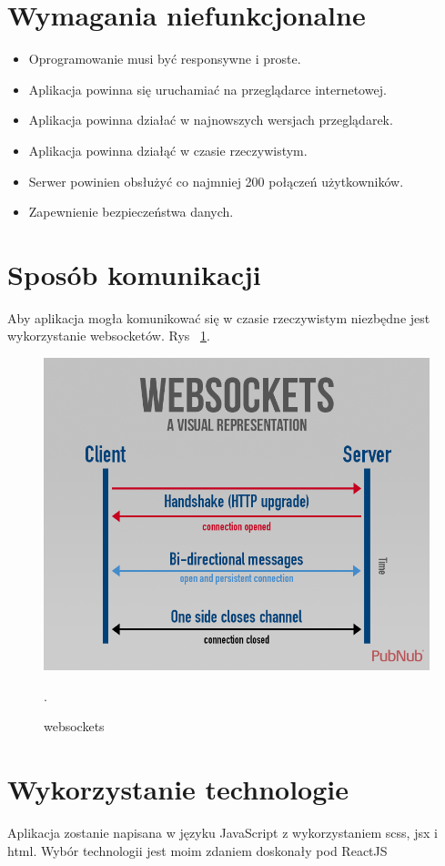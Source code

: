 \section{Wymagania niefunkcjonalne}

\begin{itemize}
    \item Oprogramowanie musi być responsywne i proste.
    \item Aplikacja powinna się uruchamiać na przeglądarce internetowej.
    \item Aplikacja powinna działać w najnowszych wersjach przeglądarek.
    \item Aplikacja powinna działąć w czasie rzeczywistym.
    \item Serwer powinien obsłużyć  co najmniej 200 połączeń użytkowników.
    \item Zapewnienie bezpieczeństwa danych.
\end{itemize}

\section{Sposób komunikacji}

Aby aplikacja mogła komunikować się w czasie rzeczywistym niezbędne jest wykorzystanie websocketów. Rys
~\ref{rys:websocket}.

\begin{figure}
	\centering\includegraphics[width=.6\textwidth]{img/websocket}
	\caption{websockets}.
	\label{rys:websocket}
\end{figure}

\section{Wykorzystanie technologie}

Aplikacja zostanie napisana w języku JavaScript z wykorzystaniem scss, jsx i html.
Wybór technologii jest moim zdaniem doskonały pod ReactJS

